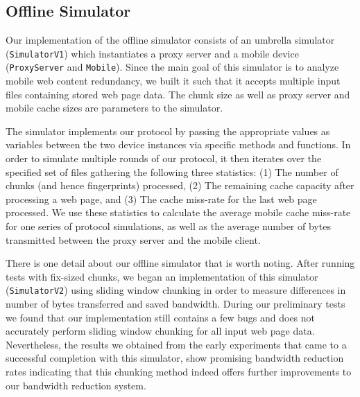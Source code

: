 \subsection{Offline Simulator}
\label{sec:offline_sim}
Our implementation of the offline simulator consists of an umbrella simulator (\texttt{SimulatorV1}) which instantiates a proxy server and a mobile device (\texttt{ProxyServer} and \texttt{Mobile}). Since the main goal of this simulator is to analyze mobile web content redundancy, we built it such that it accepts multiple input files containing stored web page data. The chunk size as well as proxy server and mobile cache sizes are parameters to the simulator.

The simulator implements our protocol by passing the appropriate values as variables between the two device instances via specific methods and functions. In order to simulate multiple rounds of our protocol, it then iterates over the specified set of files gathering the following three statistics: (1) The number of chunks (and hence fingerprints) processed, (2) The remaining cache capacity after processing a web page, and (3) The cache miss-rate for the last web page processed. We use these statistics to calculate the average mobile cache miss-rate for one series of protocol simulations, as well as the average number of bytes transmitted between the proxy server and the mobile client.

There is one detail about our offline simulator that is worth noting. After running tests with fix-sized chunks, we began an implementation of this simulator (\texttt{SimulatorV2}) using sliding window chunking in order to measure differences in number of bytes transferred and saved bandwidth. During our preliminary tests we found that our implementation still contains a few bugs and does not accurately perform sliding window chunking for all input web page data. Nevertheless, the results we obtained from the early experiments that came to a successful completion with this simulator, show promising bandwidth reduction rates indicating that this chunking method indeed offers further improvements to our bandwidth reduction system.
